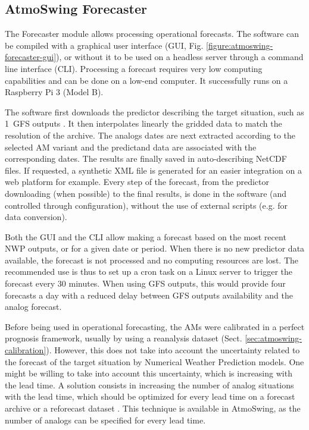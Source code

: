 \documentclass[review]{elsarticle}
\begin{document}
\subsection{AtmoSwing Forecaster}
\label{sec:forecaster}

The Forecaster module allows processing operational forecasts. The software can be compiled with a graphical user interface (GUI, Fig. \ref{figure:atmoswing-forecaster-gui}), or without it to be used on a headless server through a command line interface (CLI). Processing a forecast requires very low computing capabilities and can be done on a low-end computer. It successfully runs on a Raspberry Pi 3 (Model B).

The software first downloads the predictor describing the target situation, such as 1\degree\ GFS outputs \citep[Global Forecast System,][see Sect. \ref{sec:data}]{Kanamitsu1991,Kanamitsu1989}. It then interpolates linearly the gridded data to match the resolution of the archive. The analogs dates are next extracted according to the selected AM variant and the predictand data are associated with the corresponding dates. The results are finally saved in auto-describing NetCDF files. If requested, a synthetic XML file is generated for an easier integration on a web platform for example. Every step of the forecast, from the predictor downloading (when possible) to the final results, is done in the software (and controlled through configuration), without the use of external scripts (e.g. for data conversion).

Both the GUI and the CLI allow making a forecast based on the most recent NWP outputs, or for a given date or period. When there is no new predictor data available, the forecast is not processed and no computing resources are lost. The recommended use is thus to set up a cron task on a Linux server to trigger the forecast every 30 minutes. When using GFS outputs, this would provide four forecasts a day with a reduced delay between GFS outputs availability and the analog forecast. 

Before being used in operational forecasting, the AMs were calibrated in a perfect prognosis framework, usually by using a reanalysis dataset (Sect. \ref{sec:atmoswing-calibration}). However, this does not take into account the uncertainty related to the forecast of the target situation by Numerical Weather Prediction models. One might be willing to take into account this uncertainty, which is increasing with the lead time. A solution consists in increasing the number of analog situations with the lead time, which should be optimized for every lead time on a forecast archive or a reforecast dataset \citep{Thevenot2004}. This technique is available in AtmoSwing, as the number of analogs can be specified for every lead time.
\end{document}
